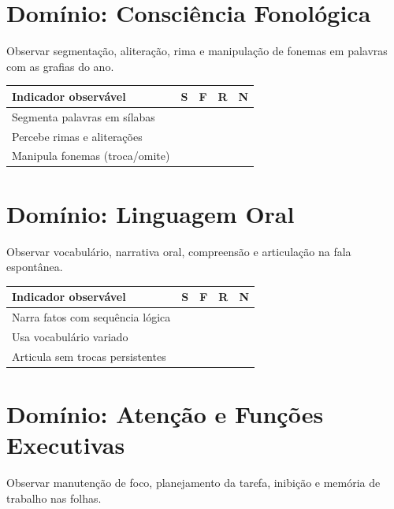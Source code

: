 \section{Domínio: Consciência Fonológica}
Observar segmentação, aliteração, rima e manipulação de fonemas em palavras com as grafias do ano.

\begin{center}
\renewcommand{\arraystretch}{1.4}
\begin{tabular}{@{}p{9cm}cccc@{}}
\toprule
Indicador observável & S & F & R & N \\
\midrule

Segmenta palavras em sílabas & & & & \\

Percebe rimas e aliterações & & & & \\

Manipula fonemas (troca/omite) & & & & \\

\bottomrule\end{tabular}\end{center}

\section{Domínio: Linguagem Oral}
Observar vocabulário, narrativa oral, compreensão e articulação na fala espontânea.

\begin{center}
\renewcommand{\arraystretch}{1.4}
\begin{tabular}{@{}p{9cm}cccc@{}}
\toprule
Indicador observável & S & F & R & N \\
\midrule

Narra fatos com sequência lógica & & & & \\

Usa vocabulário variado & & & & \\

Articula sem trocas persistentes & & & & \\

\bottomrule\end{tabular}\end{center}

\section{Domínio: Atenção e Funções Executivas}
Observar manutenção de foco, planejamento da tarefa, inibição e memória de trabalho nas folhas.

